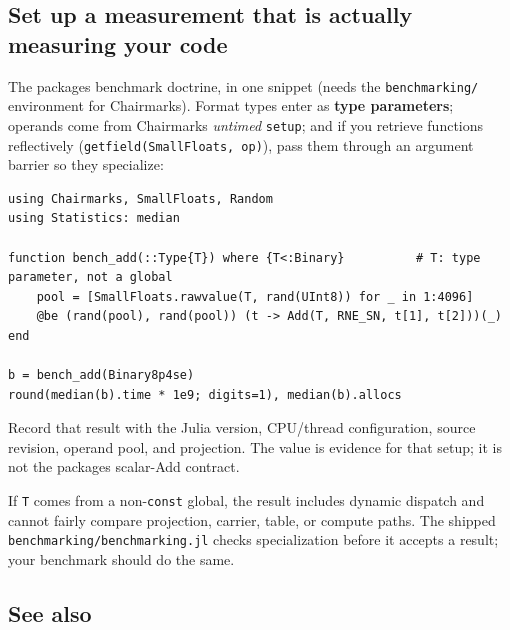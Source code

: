 \subsection{Set up a measurement that is actually measuring your code}



\label{6060984325283592858}{}


The package{\textquotesingle}s benchmark doctrine, in one snippet (needs the \texttt{benchmarking/} environment for Chairmarks). Format types enter as \textbf{type parameters}; operands come from Chairmarks{\textquotesingle} \emph{untimed} \texttt{setup}; and if you retrieve functions reflectively (\texttt{getfield(\allowbreak{}SmallFloats, op)}), pass them through an argument barrier so they specialize:




\nopagebreak[4]
\begin{verbatim}
using Chairmarks, SmallFloats, Random
using Statistics: median

function bench_add(::Type{T}) where {T<:Binary}          # T: type parameter, not a global
    pool = [SmallFloats.rawvalue(T, rand(UInt8)) for _ in 1:4096]
    @be (rand(pool), rand(pool)) (t -> Add(T, RNE_SN, t[1], t[2]))(_)
end

b = bench_add(Binary8p4se)
round(median(b).time * 1e9; digits=1), median(b).allocs
\end{verbatim}



Record that result with the Julia version, CPU/thread configuration, source revision, operand pool, and projection. The value is evidence for that setup; it is not the package{\textquotesingle}s scalar-Add contract.



\begin{tcolorbox}[toptitle=-1mm,bottomtitle=1mm,colback=admonition-warning!50!white,colframe=admonition-warning,title=\textbf{Do not benchmark unresolved globals}]
If \texttt{T} comes from a non-\texttt{const} global, the result includes dynamic dispatch and cannot fairly compare projection, carrier, table, or compute paths. The shipped \texttt{benchmarking/\allowbreak{}benchmarking.jl} checks specialization before it accepts a result; your benchmark should do the same.

\end{tcolorbox}


\subsection{See also}



